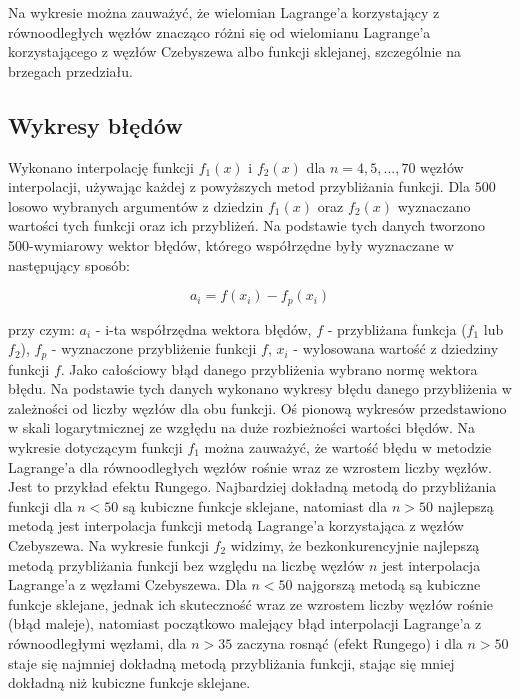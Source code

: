 \documentclass{article}
\begin{document}
	Na wykresie można zauważyć, że wielomian Lagrange'a korzystający z równoodległych węzłów znacząco różni się od wielomianu Lagrange'a korzystającego z węzłów Czebyszewa albo funkcji sklejanej, szczególnie na brzegach przedziału.
	
	
	
	
	\subsection*{Wykresy błędów}
	
	Wykonano interpolację funkcji $f_1(x)$ i $f_2(x)$ dla $n = 4,5,...,70$ węzłów interpolacji, używając każdej z powyższych metod przybliżania funkcji. Dla $500$ losowo wybranych argumentów z dziedzin $f_1(x)$ oraz $f_2(x)$ wyznaczano wartości tych funkcji oraz ich przybliżeń. Na podstawie tych danych tworzono 500-wymiarowy wektor błędów, którego współrzędne były wyznaczane w następujący sposób:
	
	\begin{equation}
		a_i = f(x_i)-f_p(x_i)
	\end{equation}	 
	
	przy czym: $a_i$ - i-ta współrzędna wektora błędów, $f$ - przybliżana funkcja ($f_1$ lub $f_2$), $f_p$ - wyznaczone przybliżenie funkcji $f$, $x_i$ - wylosowana wartość z dziedziny funkcji $f$.	
	\newline \newline
	Jako całościowy błąd danego przybliżenia wybrano normę wektora błędu. Na podstawie tych danych wykonano wykresy błędu danego przybliżenia w zależności od liczby węzłów dla obu funkcji. Oś pionową wykresów przedstawiono w skali logarytmicznej ze wzgłędu na duże rozbieżności wartości błędów. \newline \newline
	Na wykresie dotyczącym funkcji $f_1$ można zauważyć, że wartość błędu w metodzie Lagrange'a dla równoodległych węzłów rośnie wraz ze wzrostem liczby węzłów. Jest to przykład efektu Rungego. Najbardziej dokładną metodą do przybliżania funkcji dla $n<50$ są kubiczne funkcje sklejane, natomiast dla $n>50$ najlepszą metodą jest interpolacja funkcji metodą Lagrange'a korzystająca z węzłów Czebyszewa. \newline \newline
	Na wykresie funkcji $f_2$ widzimy, że bezkonkurencyjnie najlepszą metodą przybliżania funkcji bez względu na liczbę węzłów $n$ jest interpolacja Lagrange'a z węzłami Czebyszewa. Dla $n<50$ najgorszą metodą są kubiczne funkcje sklejane, jednak ich skuteczność wraz ze wzrostem liczby węzłów rośnie (błąd maleje), natomiast początkowo malejący błąd interpolacji Lagrange'a z równoodległymi węzłami, dla $n>35$ zaczyna rosnąć (efekt Rungego) i dla $n>50$ staje się najmniej dokładną metodą przybliżania funkcji, stając się mniej dokładną niż kubiczne funkcje sklejane.
	
\end{document}

